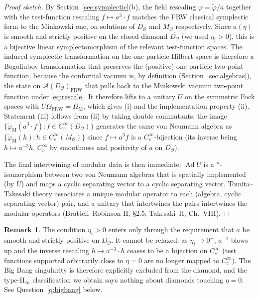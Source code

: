 \documentclass[11pt]{article}
\theoremstyle{definition}
\newtheorem{remark}[theorem]{Remark}
\renewcommand{\AA}{\mathcal{A}}
\newcommand{\OO}{\mathcal{O}}
\newcommand{\Ad}{\operatorname{Ad}}
\newcommand{\FRW}{\mathrm{FRW}}
\newcommand{\Mink}{\mathrm{M}}
\begin{document}
\begin{proof}[Proof sketch]
By Section~\ref{sec:symplectic}(b), the field rescaling $\varphi = \tilde\varphi/a$ together with the test-function rescaling $f\mapsto a^3\cdot f$ matches the FRW classical symplectic form to the Minkowski one, on solutions of $D_\OO$ and $M_\OO$ respectively. Since $a(\eta)$ is smooth and strictly positive on the closed diamond $\overline{D_\OO}$ (we used $\eta_i>0$), this is a bijective linear symplectomorphism of the relevant test-function spaces. The induced symplectic transformation on the one-particle Hilbert space is therefore a Bogoliubov transformation that preserves the (positive) one-particle two-point function, because the conformal vacuum is, by definition (Section~\ref{sec:algebras}), the state on $\AA(D_\OO)_\FRW$ that pulls back to the Minkowski vacuum two-point function under \eqref{eq:rescale}. It therefore lifts to a unitary $U$ on the symmetric Fock spaces with $U\Omega_\FRW = \Omega_\Mink$, which gives (i) and the implementation property (ii). Statement (iii) follows from (ii) by taking double commutants: the image $\{\tilde\varphi_\Mink(a^3\cdot f) : f \in C_c^\infty(D_\OO)\}$ generates the same von Neumann algebra as $\{\tilde\varphi_\Mink(h) : h \in C_c^\infty(M_\OO)\}$ since $f\mapsto a^3 f$ is a $C_c^\infty$-bijection (its inverse being $h\mapsto a^{-3} h$, $C_c^\infty$ by smoothness and positivity of $a$ on $\overline{D_\OO}$).

The final intertwining of modular data is then immediate: $\Ad U$ is a $*$-isomorphism between two von Neumann algebras that is spatially implemented (by $U$) and maps a cyclic separating vector to a cyclic separating vector. Tomita--Takesaki theory associates a unique modular operator to each (algebra, cyclic separating vector) pair, and a unitary that intertwines the pairs intertwines the modular operators (Bratteli--Robinson II, \S2.5; Takesaki~II, Ch.~VIII).
\end{proof}

\begin{remark}\label{rem:eta-positive}
The condition $\eta_i>0$ enters only through the requirement that $a$ be smooth and strictly positive on $\overline{D_\OO}$. It cannot be relaxed: as $\eta_i\to 0^+$, $a^{-1}$ blows up and the inverse rescaling $h\mapsto a^{-3}\cdot h$ ceases to be a bijection on $C_c^\infty$ (test functions supported arbitrarily close to $\eta=0$ are no longer mapped to $C_c^\infty$). The Big Bang singularity is therefore explicitly excluded from the diamond, and the type-II$_\infty$ classification we obtain says nothing about diamonds touching $\eta=0$. See Question~\ref{q:bigbang} below.
\end{remark}
\end{document}
